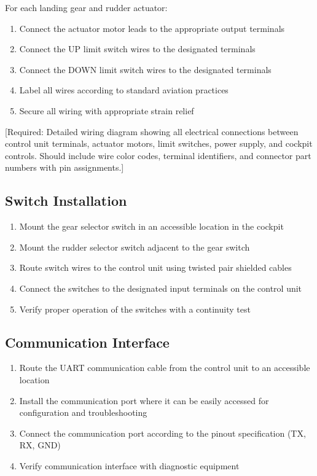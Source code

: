 \documentclass[12pt,a4paper,twoside,openright]{book}
\begin{document}
For each landing gear and rudder actuator:

\begin{enumerate}
    \item Connect the actuator motor leads to the appropriate output terminals
    \item Connect the UP limit switch wires to the designated terminals
    \item Connect the DOWN limit switch wires to the designated terminals
    \item Label all wires according to standard aviation practices
    \item Secure all wiring with appropriate strain relief
\end{enumerate}

{\color{missingred}[Required: Detailed wiring diagram showing all electrical connections between control unit terminals, actuator motors, limit switches, power supply, and cockpit controls. Should include wire color codes, terminal identifiers, and connector part numbers with pin assignments.]}

\subsection{Switch Installation}

\begin{enumerate}
    \item Mount the gear selector switch in an accessible location in the cockpit
    \item Mount the rudder selector switch adjacent to the gear switch
    \item Route switch wires to the control unit using twisted pair shielded cables
    \item Connect the switches to the designated input terminals on the control unit
    \item Verify proper operation of the switches with a continuity test
\end{enumerate}

\subsection{Communication Interface}

\begin{enumerate}
    \item Route the UART communication cable from the control unit to an accessible location
    \item Install the communication port where it can be easily accessed for configuration and troubleshooting
    \item Connect the communication port according to the pinout specification (TX, RX, GND)
    \item Verify communication interface with diagnostic equipment
\end{enumerate}
\end{document}
